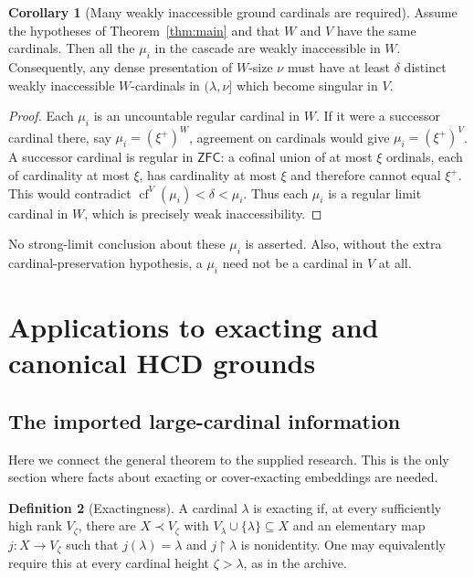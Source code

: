 \documentclass[11pt,letterpaper]{article}
\theoremstyle{definition}
\newtheorem{definition}{Definition}[section]
\newtheorem{corollary}[definition]{Corollary}
\numberwithin{equation}{section}
\newcommand{\ZFC}{\mathsf{ZFC}}
\newcommand{\cf}{\operatorname{cf}}
\newcommand{\restr}{\mathbin{\upharpoonright}}
\begin{document}
\begin{corollary}[Many weakly inaccessible ground cardinals are required]\label{cor:weakly}
Assume the hypotheses of Theorem~\ref{thm:main} and that $W$ and $V$ have the same cardinals. Then all the $\mu_i$ in the cascade are weakly inaccessible in $W$. Consequently, any dense presentation of $W$-size $\nu$ must have at least $\delta$ distinct weakly inaccessible $W$-cardinals in $(\lambda,\nu]$ which become singular in $V$.
\end{corollary}
\begin{proof}
Each $\mu_i$ is an uncountable regular cardinal in $W$. If it were a successor cardinal there, say $\mu_i=(\xi^+)^W$, agreement on cardinals would give $\mu_i=(\xi^+)^V$. A successor cardinal is regular in $\ZFC$: a cofinal union of at most $\xi$ ordinals, each of cardinality at most $\xi$, has cardinality at most $\xi$ and therefore cannot equal $\xi^+$. This would contradict $\cf^V(\mu_i)<\delta<\mu_i$. Thus each $\mu_i$ is a regular limit cardinal in $W$, which is precisely weak inaccessibility.
\end{proof}

No strong-limit conclusion about these $\mu_i$ is asserted. Also, without the extra cardinal-preservation hypothesis, a $\mu_i$ need not be a cardinal in $V$ at all.

\section{Applications to exacting and canonical HCD grounds}\label{sec:applications}

\subsection{The imported large-cardinal information}

Here we connect the general theorem to the supplied research. This is the only section where facts about exacting or cover-exacting embeddings are needed.

\begin{definition}[Exactingness]
A cardinal $\lambda$ is exacting if, at every sufficiently high rank $V_\zeta$, there are
$X\prec V_\zeta$ with $V_\lambda\cup\{\lambda\}\subseteq X$ and an elementary map $j:X\to V_\zeta$ such that $j(\lambda)=\lambda$ and $j\restr\lambda$ is nonidentity. One may equivalently require this at every cardinal height $\zeta>\lambda$, as in the archive.
\end{definition}
\end{document}
